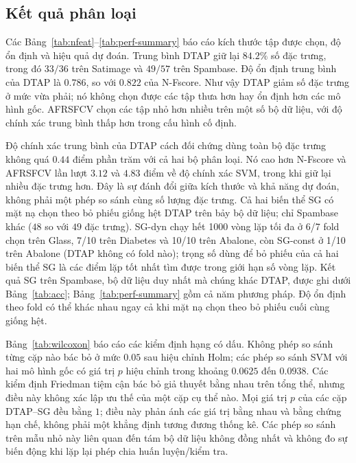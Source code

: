 \documentclass[]{interact}
\theoremstyle{plain}
\theoremstyle{definition}
\theoremstyle{remark}
\begin{document}
\subsection{Kết quả phân loại}\label{ssec:results}
Các Bảng~\ref{tab:nfeat}--\ref{tab:perf-summary} báo cáo kích thước tập được chọn,
độ ổn định và hiệu quả dự đoán. Trung bình DTAP giữ lại $84.2\%$ số đặc trưng,
trong đó $33/36$ trên Satimage và $49/57$ trên Spambase.
Độ ổn định trung bình của DTAP là $0.786$, so với $0.822$ của N-Fscore.
Như vậy DTAP giảm số đặc trưng ở mức vừa phải; nó không chọn được các tập thưa hơn hay
ổn định hơn các mô hình gốc. AFRSFCV chọn các tập nhỏ hơn nhiều trên một số bộ dữ liệu,
với độ chính xác trung bình thấp hơn trong cấu hình cố định.

Độ chính xác trung bình của DTAP cách đối chứng dùng toàn bộ đặc trưng không quá $0.44$ điểm phần trăm
với cả hai bộ phân loại. Nó cao hơn N-Fscore và AFRSFCV lần lượt $3.12$
và $4.83$ điểm về độ chính xác SVM, trong khi giữ lại nhiều đặc trưng hơn.
Đây là sự đánh đổi giữa kích thước và khả năng dự đoán, không phải một phép so sánh cùng số lượng đặc trưng.
Cả hai biến thể SG có mặt nạ chọn theo bỏ phiếu giống hệt DTAP trên bảy bộ dữ liệu;
chỉ Spambase khác ($48$ so với $49$ đặc trưng).
SG-dyn chạy hết 1000 vòng lặp tối đa ở 6/7 fold chọn trên Glass,
7/10 trên Diabetes và 10/10 trên Abalone, còn SG-const ở 1/10 trên Abalone
(DTAP không có fold nào); trọng số dùng để bỏ phiếu của cả hai biến thể SG là các điểm lặp tốt nhất
tìm được trong giới hạn số vòng lặp. Kết quả SG trên Spambase, bộ dữ liệu duy nhất
mà chúng khác DTAP, được ghi dưới Bảng~\ref{tab:acc};
Bảng~\ref{tab:perf-summary} gồm cả năm phương pháp.
Độ ổn định theo fold có thể khác nhau ngay cả khi mặt nạ chọn theo bỏ phiếu cuối cùng giống hệt.

Bảng~\ref{tab:wilcoxon} báo cáo các kiểm định hạng có dấu. Không phép so sánh từng cặp nào
bác bỏ ở mức $0.05$ sau hiệu chỉnh Holm; các phép so sánh SVM với
hai mô hình gốc có giá trị $p$ hiệu chỉnh trong khoảng $0.0625$ đến $0.0938$.
Các kiểm định Friedman tiệm cận bác bỏ giả thuyết bằng nhau trên tổng thể, nhưng điều này không xác lập
ưu thế của một cặp cụ thể nào. Mọi giá trị $p$ của các cặp DTAP--SG đều bằng $1$;
điều này phản ánh các giá trị bằng nhau và bằng chứng hạn chế, không phải một khẳng định tương đương thống kê.
Các phép so sánh trên mẫu nhỏ này liên quan đến tám bộ dữ liệu không đồng nhất và không
đo sự biến động khi lặp lại phép chia huấn luyện/kiểm tra.
\end{document}
